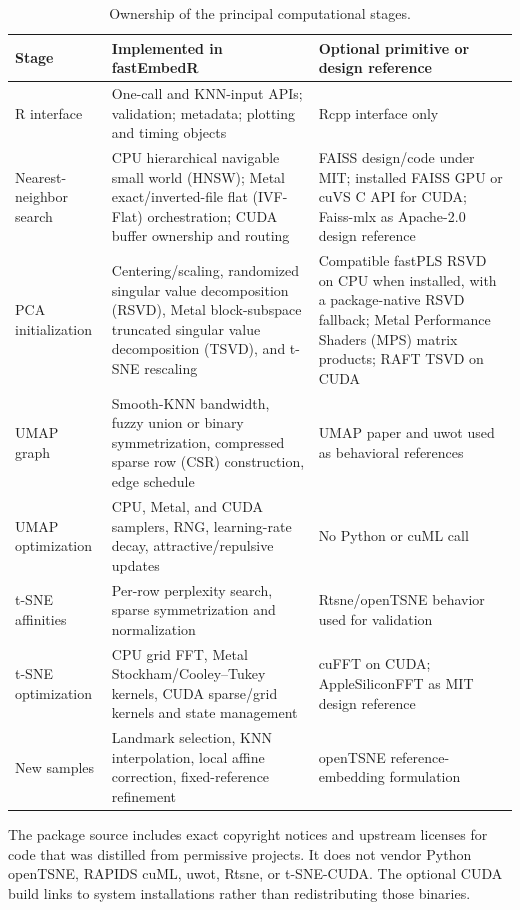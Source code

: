 \documentclass[twoside,11pt]{article}
\begin{document}
\begin{table}[ht]
\centering
\caption{Ownership of the principal computational stages.}
\label{tab:ownership}
\small
\begin{tabular}{p{}p{}p{}}
\toprule
Stage & Implemented in fastEmbedR & Optional primitive or design reference\\
\midrule
R interface & One-call and KNN-input APIs; validation; metadata; plotting and timing objects & Rcpp interface only\\
Nearest-neighbor search & CPU hierarchical navigable small world (HNSW); Metal exact/inverted-file flat (IVF-Flat) orchestration; CUDA buffer ownership and routing & FAISS design/code under MIT; installed FAISS GPU or cuVS C API for CUDA; Faiss-mlx as Apache-2.0 design reference\\
PCA initialization & Centering/scaling, randomized singular value decomposition (RSVD), Metal block-subspace truncated singular value decomposition (TSVD), and t-SNE rescaling & Compatible fastPLS RSVD on CPU when installed, with a package-native RSVD fallback; Metal Performance Shaders (MPS) matrix products; RAFT TSVD on CUDA\\
UMAP graph & Smooth-KNN bandwidth, fuzzy union or binary symmetrization, compressed sparse row (CSR) construction, edge schedule & UMAP paper and uwot used as behavioral references\\
UMAP optimization & CPU, Metal, and CUDA samplers, RNG, learning-rate decay, attractive/repulsive updates & No Python or cuML call\\
t-SNE affinities & Per-row perplexity search, sparse symmetrization and normalization & Rtsne/openTSNE behavior used for validation\\
t-SNE optimization & CPU grid FFT, Metal Stockham/Cooley--Tukey kernels, CUDA sparse/grid kernels and state management & cuFFT on CUDA; AppleSiliconFFT as MIT design reference\\
New samples & Landmark selection, KNN interpolation, local affine correction, fixed-reference refinement & openTSNE reference-embedding formulation\\
\bottomrule
\end{tabular}
\end{table}

The package source includes exact copyright notices and upstream licenses for code that was distilled from permissive projects. It does not vendor Python openTSNE, RAPIDS cuML, uwot, Rtsne, or t-SNE-CUDA. The optional CUDA build links to system installations rather than redistributing those binaries.
\end{document}
